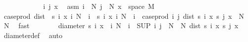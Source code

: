 \begin{isabellebody}
\ \ \ \ \isacommand{{\isacharbraceleft}{\kern0pt}}\isamarkupfalse%
\isanewline
\ \ \ \ \ \ \isamarkupfalse%
\ i\ j\ x\ \isamarkupfalse%
\ asm{\isacharcolon}{\kern0pt}\ {\isachardoublequoteopen}i\ {\isasymge}\ N{\isachardoublequoteclose}\ {\isachardoublequoteopen}j\ {\isasymge}\ N{\isachardoublequoteclose}\ {\isachardoublequoteopen}x\ {\isasymin}\ space\ M{\isachardoublequoteclose}\isanewline
\ \ \ \ \ \ \isamarkupfalse%
\ {\isachardoublequoteopen}case{\isacharunderscore}{\kern0pt}prod\ dist\ {\isacharbackquote}{\kern0pt}\ {\isacharparenleft}{\kern0pt}{\isacharbraceleft}{\kern0pt}s\ i\ x\ {\isacharbar}{\kern0pt}i{\isachardot}{\kern0pt}\ N\ {\isasymle}\ i{\isacharbraceright}{\kern0pt}\ {\isasymtimes}\ {\isacharbraceleft}{\kern0pt}s\ i\ x\ {\isacharbar}{\kern0pt}i{\isachardot}{\kern0pt}\ N\ {\isasymle}\ i{\isacharbraceright}{\kern0pt}{\isacharparenright}{\kern0pt}\ {\isacharequal}{\kern0pt}\ case{\isacharunderscore}{\kern0pt}prod\ {\isacharparenleft}{\kern0pt}{\isasymlambda}i\ j{\isachardot}{\kern0pt}\ dist\ {\isacharparenleft}{\kern0pt}s\ i\ x{\isacharparenright}{\kern0pt}\ {\isacharparenleft}{\kern0pt}s\ j\ x{\isacharparenright}{\kern0pt}{\isacharparenright}{\kern0pt}\ {\isacharbackquote}{\kern0pt}\ {\isacharparenleft}{\kern0pt}{\isacharbraceleft}{\kern0pt}N{\isachardot}{\kern0pt}{\isachardot}{\kern0pt}{\isacharbraceright}{\kern0pt}\ {\isasymtimes}\ {\isacharbraceleft}{\kern0pt}N{\isachardot}{\kern0pt}{\isachardot}{\kern0pt}{\isacharbraceright}{\kern0pt}{\isacharparenright}{\kern0pt}{\isachardoublequoteclose}\ \isamarkupfalse%
\ fast\isanewline
\ \ \ \ \ \ \isamarkupfalse%
\ {\isachardoublequoteopen}diameter\ {\isacharbraceleft}{\kern0pt}s\ i\ x\ {\isacharbar}{\kern0pt}\ i{\isachardot}{\kern0pt}\ N\ {\isasymle}\ i{\isacharbraceright}{\kern0pt}\ {\isacharequal}{\kern0pt}\ {\isacharparenleft}{\kern0pt}SUP\ {\isacharparenleft}{\kern0pt}i{\isacharcomma}{\kern0pt}\ j{\isacharparenright}{\kern0pt}\ {\isasymin}\ {\isacharbraceleft}{\kern0pt}N{\isachardot}{\kern0pt}{\isachardot}{\kern0pt}{\isacharbraceright}{\kern0pt}\ {\isasymtimes}\ {\isacharbraceleft}{\kern0pt}N{\isachardot}{\kern0pt}{\isachardot}{\kern0pt}{\isacharbraceright}{\kern0pt}{\isachardot}{\kern0pt}\ dist\ {\isacharparenleft}{\kern0pt}s\ i\ x{\isacharparenright}{\kern0pt}\ {\isacharparenleft}{\kern0pt}s\ j\ x{\isacharparenright}{\kern0pt}{\isacharparenright}{\kern0pt}{\isachardoublequoteclose}\ \isamarkupfalse%
\ diameter{\isacharunderscore}{\kern0pt}def\ \isamarkupfalse%
\ auto\isanewline

\end{isabellebody}
